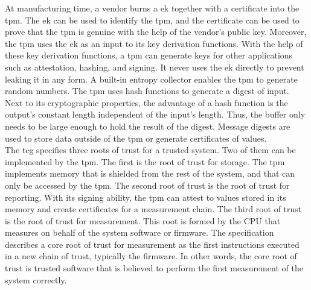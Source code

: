 At manufacturing time, a vendor burns a \gls{ek} together with a certificate
into the \gls{tpm}. The \gls{ek} can be used to identify the \gls{tpm}, and the
certificate can be used to prove that the \gls{tpm} is genuine with the help of
the vendor's public key. Moreover, the \gls{tpm} uses the \gls{ek} as an input
to its key derivation functions. With the help of these key derivation
functions, a \gls{tpm} can generate keys for other applications such as
attestation, hashing, and signing. It never uses the \gls{ek} directly to
prevent leaking it in any form. A built-in entropy collector enables the
\gls{tpm} to generate random numbers. The \gls{tpm} uses hash functions to
generate a digest of input. Next to its cryptographic properties, the advantage
of a hash function is the output's constant length independent of the input's
length. Thus, the buffer only needs to be large enough to hold the result of the
digest. Message digests are used to store data outside of the \gls{tpm} or
generate certificates of values.%
\\

The \gls{tcg} specifies three roots of trust for a trusted system. Two of them
can be implemented by the \gls{tpm}. The first is the root of trust for storage.
The \gls{tpm} implements memory that is shielded from the rest of the system,
and that can only be accessed by the \gls{tpm}. The second root of trust is the
root of trust for reporting. With its signing ability, the \gls{tpm} can attest
to values stored in its memory and create certificates for a measurement chain.
The third root of trust is the root of trust for measurement. This root is
formed by the CPU that measures on behalf of the system software or firmware.
The specification describes a core root of trust for measurement as the first
instructions executed in a new chain of trust, typically the firmware. In other
words, the core root of trust is trusted software that is believed to perform
the first measurement of the system correctly.\\

